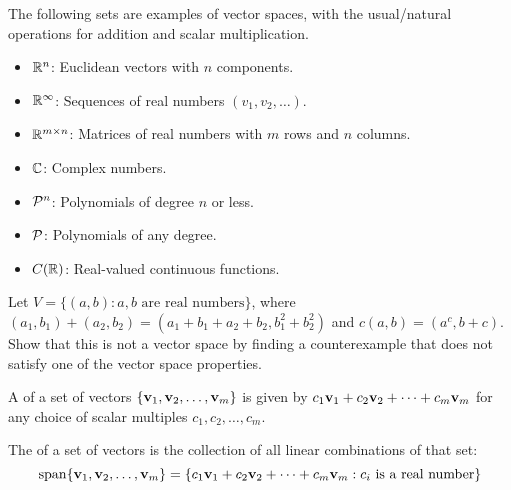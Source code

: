 
\begin{applicationActivities}{2}{8}

\begin{remark}
  The following sets are examples of vector spaces, with the usual/natural
  operations for addition and scalar multiplication.
  \begin{itemize}
    \item \(\IR^n\): Euclidean vectors with \(n\) components.
    \item \(\IR^\infty\): Sequences of real numbers \((v_1,v_2,\dots)\).
    \item \(\IR^{m\times n}\): Matrices of real numbers with \(m\) rows and
          \(n\) columns.
    \item \(\IC\): Complex numbers.
    \item \(\P^n\): Polynomials of degree \(n\) or less.
    \item \(\P\): Polynomials of any degree.
    \item \(C(\IR)\): Real-valued continuous functions.
  \end{itemize}
\end{remark}

\begin{activity}{15}
  Let \(V=\{(a,b):a,b\text{ are real numbers}\}\), where \((a_1,b_1)+(a_2,b_2)=
  (a_1+b_1+a_2+b_2,b_1^2+b_2^2)\) and \(c(a,b)=(a^c,b+c)\). Show that
  this is not a vector space by finding a counterexample
  that does not satisfy one of the vector space properties.

  \vectorSpaceProperties
\end{activity}

\begin{definition}
  A  of a set of vectors
  \(\{\vect v_1,\vect v_2,\dots,\vect v_m\}\) is given by
  \(c_1\vect v_1+c_2\vect v_2+\dots+c_m\vect v_m\) for any choice of
  scalar multiples \(c_1,c_2,\dots,c_m\).
\end{definition}

\begin{definition}
  The  of a set of vectors is the collection of all linear
  combinations of that set:
  \[
    \vspan\{\vect v_1,\vect v_2,\dots,\vect v_m\} =
    \{c_1\vect v_1+c_2\vect v_2+\dots+c_m\vect v_m :
    c_i\text{ is a real number}\}
  \]
\end{definition}


\end{applicationActivities}
